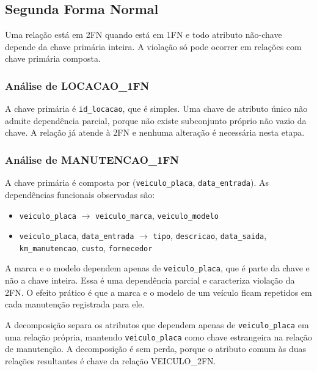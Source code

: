 \subsection{Segunda Forma Normal}

Uma rela\c{c}\~ao est\'a em 2FN quando est\'a em 1FN e todo atributo n\~ao-chave depende da chave prim\'aria inteira. A viola\c{c}\~ao s\'o pode ocorrer em rela\c{c}\~oes com chave prim\'aria composta.

\subsubsection{An\'alise de LOCACAO\_1FN}
A chave prim\'aria \'e \texttt{id\_locacao}, que \'e simples. Uma chave de atributo \'unico n\~ao admite depend\^encia parcial, porque n\~ao existe subconjunto pr\'oprio n\~ao vazio da chave. A rela\c{c}\~ao j\'a atende \`a 2FN e nenhuma altera\c{c}\~ao \'e necess\'aria nesta etapa.

\subsubsection{An\'alise de MANUTENCAO\_1FN}
A chave prim\'aria \'e composta por (\texttt{veiculo\_placa}, \texttt{data\_entrada}). As depend\^encias funcionais observadas s\~ao:

{\raggedright
\begin{itemize}
\item \texttt{veiculo\_placa} $\rightarrow$ \texttt{veiculo\_marca}, \texttt{veiculo\_modelo}
\item \texttt{veiculo\_placa}, \texttt{data\_entrada} $\rightarrow$ \texttt{tipo}, \texttt{descricao}, \texttt{data\_saida}, \texttt{km\_manutencao}, \texttt{custo}, \texttt{fornecedor}
\end{itemize}
\par}

A marca e o modelo dependem apenas de \texttt{veiculo\_placa}, que \'e parte da chave e n\~ao a chave inteira. Essa \'e uma depend\^encia parcial e caracteriza viola\c{c}\~ao da 2FN. O efeito pr\'atico \'e que a marca e o modelo de um ve\'iculo ficam repetidos em cada manuten\c{c}\~ao registrada para ele.

A decomposi\c{c}\~ao separa os atributos que dependem apenas de \texttt{veiculo\_placa} em uma rela\c{c}\~ao pr\'opria, mantendo \texttt{veiculo\_placa} como chave estrangeira na rela\c{c}\~ao de manuten\c{c}\~ao. A decomposi\c{c}\~ao \'e sem perda, porque o atributo comum \`as duas rela\c{c}\~oes resultantes \'e chave da rela\c{c}\~ao VEICULO\_2FN.

